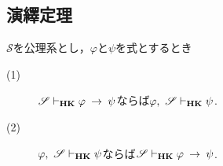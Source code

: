 \subsection{演繹定理}
	\begin{screen}
		\begin{metathm}[{\bf HK}の演繹定理]
		\label{metathm:deduction_theorem_of_HK}
			$\mathscr{S}$を公理系とし，$\varphi$と$\psi$を式とするとき
			\begin{description}
				\item[(1)] $\mathscr{S} \vdash_{{\scriptsize \mbox{{\bf HK}}}} \varphi \hspace{0.25em}\rightarrow\hspace{0.25em} \psi$ならば$\varphi,\ \mathscr{S} \provable{\mbox{{\bf HK}}} \psi$.
				\item[(2)] $\varphi,\ \mathscr{S} \provable{\mbox{{\bf HK}}} \psi$ならば$\mathscr{S} \vdash_{{\scriptsize \mbox{{\bf HK}}}} \varphi \hspace{0.25em}\rightarrow\hspace{0.25em} \psi$.
			\end{description}
		\end{metathm}
	\end{screen}
	
